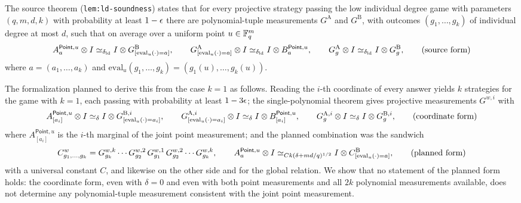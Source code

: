 \documentclass[11pt]{article}
\begin{document}
The source theorem (\texttt{lem:ld-soundness}) states that for every
projective strategy passing the low individual degree game with parameters
$(q,m,d,k)$ with probability at least $1 - \epsilon$ there are polynomial-tuple
measurements $G^{\mathrm A}$ and $G^{\mathrm B}$, with outcomes
$(g_1,\dots,g_k)$ of individual degree at most $d$, such that on average over
a uniform point $u \in \mathbb{F}_q^m$
\[
  A^{\mathsf{Point},u}_{a} \otimes I \simeq_{\delta_{\mathrm{ld}}}
    I \otimes G^{\mathrm B}_{[\mathrm{eval}_u(\cdot) = a]},
  \qquad
  G^{\mathrm A}_{[\mathrm{eval}_u(\cdot) = a]} \otimes I \simeq_{\delta_{\mathrm{ld}}}
    I \otimes B^{\mathsf{Point},u}_{a},
  \qquad
  G^{\mathrm A}_{g} \otimes I \simeq_{\delta_{\mathrm{ld}}} I \otimes G^{\mathrm B}_{g},
  \tag{source form}
\]
where $a = (a_1,\dots,a_k)$ and
$\mathrm{eval}_u(g_1,\dots,g_k) = (g_1(u),\dots,g_k(u))$.

The formalization planned to derive this from the case $k = 1$ as follows.
Reading the $i$-th coordinate of every answer yields $k$ strategies for the
game with $k = 1$, each passing with probability at least $1 - 3\epsilon$; the
single-polynomial theorem gives projective measurements $G^{w,i}$ with
\[
  A^{\mathsf{Point},u}_{[a_i]} \otimes I \simeq_{\delta}
    I \otimes G^{\mathrm B,i}_{[\mathrm{eval}_u(\cdot) = a_i]},
  \qquad
  G^{\mathrm A,i}_{[\mathrm{eval}_u(\cdot) = a_i]} \otimes I \simeq_{\delta}
    I \otimes B^{\mathsf{Point},u}_{[a_i]},
  \qquad
  G^{\mathrm A,i}_{g} \otimes I \simeq_{\delta} I \otimes G^{\mathrm B,i}_{g},
  \tag{coordinate form}
\]
where $A^{\mathsf{Point},u}_{[a_i]}$ is the $i$-th marginal of the joint
point measurement; and the planned combination was the sandwich
\[
  C^{w}_{g_1,\dots,g_k}
    = G^{w,k}_{g_k} \cdots G^{w,2}_{g_2}\, G^{w,1}_{g_1}\,
      G^{w,2}_{g_2} \cdots G^{w,k}_{g_k},
  \qquad
  A^{\mathsf{Point},u}_{a} \otimes I \simeq_{C k (\delta + md/q)^{1/2}}
    I \otimes C^{\mathrm B}_{[\mathrm{eval}_u(\cdot) = a]},
  \tag{planned form}
\]
with a universal constant $C$, and likewise on the other side and for the
global relation.  We show that no statement of the planned form holds: the
coordinate form, even with $\delta = 0$ and even with both point
measurements and all $2k$ polynomial measurements available, does not
determine any polynomial-tuple measurement consistent with the joint point
measurement.
\end{document}
